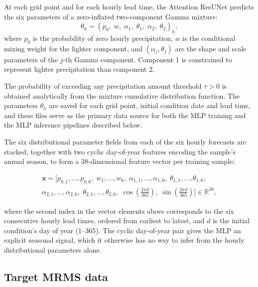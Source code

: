 \documentclass[11pt]{article}
\newcommand{\vect}[1]{\bm{#1}}
\begin{document}
At each grid point and for each hourly lead time, the Attention ResUNet predicts
the six parameters of a zero-inflated two-component Gamma mixture:
\begin{equation}
  \theta_h = (p_0,\; w,\; \alpha_1,\; \theta_1,\; \alpha_2,\; \theta_2)_h,
  \label{eq:hourly_params}
\end{equation}
where $p_0$ is the probability of zero hourly precipitation, $w$ is the
conditional mixing weight for the lighter component, and
$(\alpha_j, \theta_j)$ are the shape and scale parameters of the $j$-th
Gamma component.  Component 1 is constrained to represent lighter
precipitation than component 2.

The probability of exceeding any precipitation amount threshold $\tau > 0$ is obtained
analytically from the mixture cumulative distribution function.  The
parameters $\theta_h$ are saved for each grid point, initial condition date and lead time,
and these files serve as the primary data source for both the MLP training
and the MLP inference pipelines described below.

The six distributional parameter fields from each of the six hourly forecasts
are stacked, together with two cyclic day-of-year features encoding the
sample's annual season, to form a 38-dimensional feature vector per
training sample:
\begin{linenomath}
\begin{multline}
  \vect{x} = \bigl[
    p_{0,1},\ldots,p_{0,6},\;
    w_1,\ldots,w_6,\;
    \alpha_{1,1},\ldots,\alpha_{1,6},\;
    \theta_{1,1},\ldots,\theta_{1,6}, \\
    \alpha_{2,1},\ldots,\alpha_{2,6},\;
    \theta_{2,1},\ldots,\theta_{2,6},\;
    \cos\!\left(\tfrac{2\pi d}{365}\right),\;
    \sin\!\left(\tfrac{2\pi d}{365}\right)
  \bigr] \in \mathbb{R}^{38},
  \label{eq:feature_vec}
\end{multline}
\end{linenomath}
where the second index in the vector elements above corresponds to the
six consecutive hourly lead times, ordered from earliest to latest, and
$d$ is the initial condition's day of year (1--365).  The cyclic day-of-year
pair gives the MLP an explicit seasonal signal, which it otherwise has no
way to infer from the hourly distributional parameters alone.

\subsection{Target MRMS data}
\label{sec:mrms}
\end{document}
